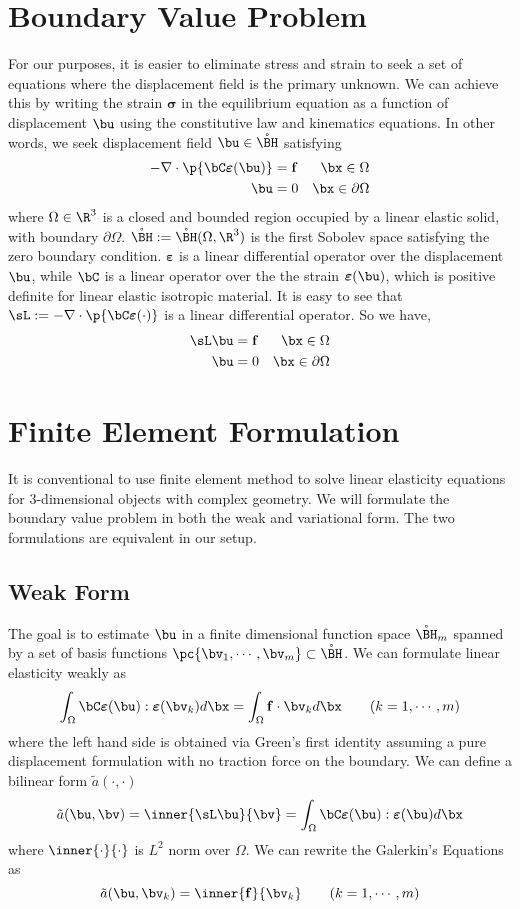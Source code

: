 \documentclass[11pt]{article}
\newcommand{\bsigma}{\boldsymbol{\sigma}}
\newcommand{\bepsilon}{\boldsymbol{\varepsilon}}
\renewcommand{\bf}{\mathbf{f}}
\newcommand{\ta}{\tilde{a}}
\begin{document}
\section*{Boundary Value Problem}
For our purposes, it is easier to eliminate stress and strain to seek a set of equations where the displacement field is the primary unknown. We can achieve this by writing the strain $\bsigma$ in the equilibrium equation as a function of displacement $\bu$ using the constitutive law and kinematics equations. In other words, we seek displacement field $\bu \in \mathring{\BH}$ satisfying
\begin{align*}
    -\nabla \cdot \p{\bC \bepsilon(\bu)}
        &= \bf & \bx\in\Omega \\
    \bu &= 0   &\bx\in\partial\Omega
\end{align*}
where $\Omega\in\R^3$ is a closed and bounded region occupied by a linear elastic solid, with boundary $\partial\Omega$. $\mathring{\BH} := \mathring{\BH}(\Omega,\R^3)$ is the first Sobolev space satisfying the zero boundary condition. $\bepsilon$ is a linear differential operator over the displacement $\bu$, while $\bC$ is a linear operator over the the strain $\bepsilon(\bu)$, which is positive definite for linear elastic isotropic material. It is easy to see that $\sL := -\nabla \cdot \p{\bC \bepsilon(\cdot)}$ is a linear differential operator. So we have,
\begin{align*}
    \sL \bu &= \bf  & \bx\in\Omega \\
    \bu   &= 0    &\bx\in\partial\Omega
\end{align*}


\section*{Finite Element Formulation}
It is conventional to use finite element method to solve linear elasticity equations for 3-dimensional objects with complex geometry. We will formulate the boundary value problem in both the weak and variational form. The two formulations are equivalent in our setup.

\subsection*{Weak Form}
The goal is to estimate $\bu$ in a finite dimensional function space $\mathring{\BH}_m$ spanned by a set of basis functions $\pc{\bv_1, \cdots, \bv_m} \subset \mathring{\BH}$. We can formulate linear elasticity weakly as
\[
    \int_{\Omega} \bC\bepsilon(\bu) : \bepsilon(\bv_k) d\bx
    = 
    \int_{\Omega} \bf \cdot \bv_k d\bx
    \tag{$k=1,\cdots,m$}
\]
where the left hand side is obtained via Green's first identity assuming a pure displacement formulation with no traction force on the boundary. We can define a bilinear form $\ta(\cdot,\cdot)$
\[
    \ta(\bu,\bv) = \inner{\sL \bu}{\bv}
        = \int_{\Omega} \bC \bepsilon(\bu) : \bepsilon(\bu) d\bx    
\]
where $\inner{\cdot}{\cdot}$ is $L^2$ norm over $\Omega$. We can rewrite the Galerkin's Equations as
\[
    \ta(\bu,\bv_k) = \inner{\bf}{\bv_k}
    \tag{$k=1,\cdots,m$}
\]
\end{document}
